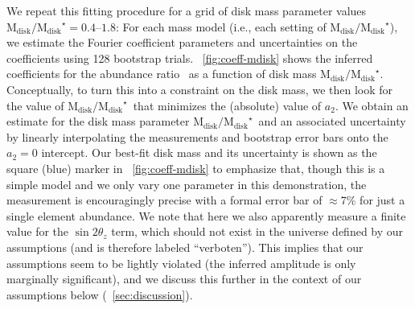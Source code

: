 \documentclass[modern]{aastex63}
\newcommand{\mdisk}{\ensuremath{\mathrm{M}_\mathrm{disk}}}
\newcommand{\mratio}{\ensuremath{\mdisk / \mdisk^\star}}
\begin{document}
We repeat this fitting procedure for a grid of disk mass parameter values
$\mratio = 0.4$--$1.8$:
For each mass model (i.e., each setting of \mratio), we estimate the Fourier
coefficient parameters and uncertainties on the coefficients using 128 bootstrap
trials.
\figurename~\ref{fig:coeff-mdisk} shows the inferred coefficients for the
abundance ratio \mgfe\ as a function of disk mass \mratio.
Conceptually, to turn this into a constraint on the disk mass, we then look for
the value of \mratio\ that minimizes the (absolute) value of $a_2$.
We obtain an estimate for the disk mass parameter \mratio\ and an associated
uncertainty by linearly interpolating the measurements and bootstrap error bars
onto the $a_2=0$ intercept.
Our best-fit disk mass and its uncertainty is shown as the square (blue)
marker in \figurename~\ref{fig:coeff-mdisk} to emphasize that, though this is a
simple model and we only vary one parameter in this demonstration, the
measurement is encouragingly precise with a formal error bar of $\approx$7\% for
just a single element abundance.
We note that here we also apparently measure a finite value for the $\sin
2\theta_z$ term, which should not exist in the universe defined by our
assumptions (and is therefore labeled ``verboten'').
This implies that our assumptions seem to be lightly violated (the inferred
amplitude is only marginally significant), and we discuss this further in the
context of our assumptions below (\sectionname~\ref{sec:discussion}).
\end{document}
